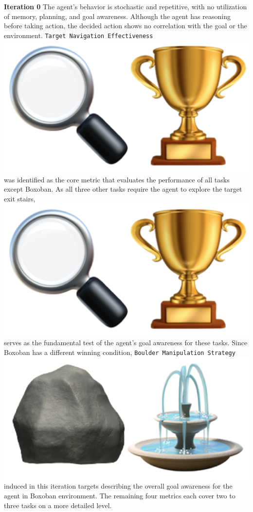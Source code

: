 \begin{flushleft}
	\textbf{Iteration 0} The agent's behavior is stochastic and repetitive, with
	no utilization of memory, planning, and goal awareness. Although the agent has
	reasoning before taking action, the decided action shows no correlation with
	the goal or the environment. \texttt{Target Navigation Effectiveness}
	\includegraphics[scale=0.05]{figs/emojis/mini_1.png}
	was identified as the core metric that evaluates the performance of all tasks
	except Boxoban. As all three other tasks require the agent to explore the target
	exit stairs,
	\includegraphics[scale=0.05]{figs/emojis/mini_1.png}
	serves as the fundamental test of the agent's goal awareness for these tasks. Since
	Boxoban has a different winning condition, \texttt{Boulder Manipulation
	Strategy}
	\includegraphics[scale=0.05]{figs/emojis/mini_4.png}
	induced in this iteration targets describing the overall goal awareness for the
	agent in Boxoban environment. The remaining four metrics each cover two to
	three tasks on a more detailed level.


\end{flushleft}
